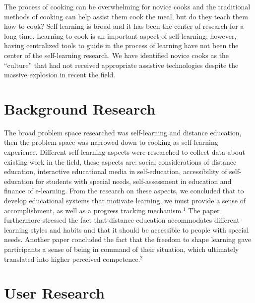 \documentclass{sigchi}
\begin{document}
The process of cooking can be overwhelming for novice cooks and the traditional methods of cooking can help assist them cook the meal, but do they teach them how to cook? Self-learning is broad and it has been the center of research for a long time. Learning to cook is an important aspect of self-learning; however, having centralized tools to guide in the process of learning have not been the center of the self-learning research. We have identified novice cooks as the “culture” that had not received appropriate assistive technologies despite the massive explosion in recent the field.

\section{Background Research}

The broad problem space researched was self-learning and distance education, then the problem space was narrowed down to cooking as self-learning experience. Different self-learning aspects were researched to collect data about existing work in the field, these aspects are: social considerations of distance education, interactive educational media in self-education, accessibility of self-education for students with special needs, self-assessment in education and finance of e-learning. From the research on these aspects, we concluded that to develop educational systems that motivate learning, we must provide a sense of accomplishment, as well as a progress tracking mechanism.$^{1}$ The paper furthermore stressed the fact that distance education accommodates different learning styles and habits and that it should be accessible to people with special needs. Another paper concluded the fact that the freedom to shape learning gave participants a sense of being in command of their situation, which ultimately translated into higher perceived competence.$^{2}$

\section{User Research}
\end{document}
